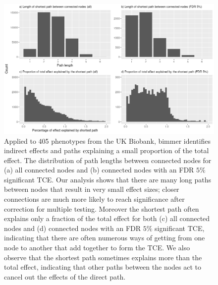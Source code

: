 \documentclass{article}
\begin{document}
\begin{figure}
\includegraphics[width=\textwidth]{figures/figure6.png}
\caption{Applied to 405 phenotypes from the UK Biobank,
bimmer identifies indirect effects and paths explaining a small proportion of the total effect.
The distribution of path lengths between connected nodes for (a) all connected nodes and (b) connected
nodes with an FDR $5\%$ significant TCE. Our analysis shows that there are many long paths between
nodes that result in very small effect sizes; closer connections are much more likely to reach
significance after correction for multiple testing. Moreover the shortest path often explains only
a fraction of the total effect for both (c) all connected nodes and (d) connected
nodes with an FDR $5\%$ significant TCE, indicating that there are often numerous ways of
getting from one node to another that add together to form the TCE. We also observe that the shortest
path sometimes explains more than the total effect, indicating that other paths between the nodes
act to cancel out the effects of the direct path. }
\label{figure6}
\end{figure}
\end{document}
